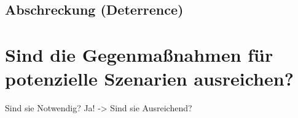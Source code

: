 \documentclass[final,bibliography=totocnumbered]{include/sikseminar}
\begin{document}

\subsection{Abschreckung (Deterrence)}\label{subsec:abschreckung} %

\section{Sind die Gegenmaßnahmen für potenzielle Szenarien ausreichen?}\label{sec:diskussion}

Sind sie Notwendig?
Ja! -> Sind sie Ausreichend?

\newpage
\printglossary[type=\acronymtype]
~\nocite{*}

\printbibliography
\newpage
\end{document}
